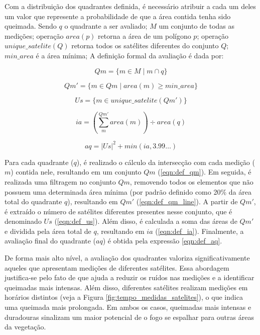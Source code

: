 \documentclass[cic,tc]{iiufrgs}
\begin{document}
Com a distribuição dos quadrantes definida, é necessário atribuir a cada um deles um valor que represente a probabilidade de que a área contida tenha sido queimada. Sendo $q$ o quadrante a ser avaliado; $M$ um conjunto de todas as medições; operação $area(p)$ retorna a área de um polígono $p$; operação $unique\_satelite(Q)$ retorna todos os satélites diferentes do conjunto $Q$; $min\_area$ é a área mínima; A definição formal da avaliação é dada por: \par

\begin{equation} \label{eqn:def_qm}
Qm = \{ m \in M \mid m \cap q \}
\end{equation}

\begin{equation} \label{eqn:def_qm_line}
Qm' = \{ m \in Qm \mid area\left(m\right) \ge min\_area \}
\end{equation}

\begin{equation} \label{eqn:def_us}
Us = \{ m \in unique\_satelite\left(Qm'\right) \}
\end{equation}

\begin{equation} \label{eqn:def_ia}
ia = \left(\sum_{m}^{Qm'} area\left(m\right)\right) \div area(q)
\end{equation}

\begin{equation} \label{eqn:def_aq}
aq = |Us|^2 + min\left(ia, 3.99\ldots \right)
\end{equation}

Para cada quadrante ($q$), é realizado o cálculo da intersecção com cada medição ($m$) contida nele, resultando em um conjunto $Qm$ (\ref{eqn:def_qm}). Em seguida, é realizada uma filtragem no conjunto $Qm$, removendo todos os elementos que não possuem uma determinada área mínima (por padrão definido como 20\% da área total do quadrante $q$), resultando em $Qm'$ (\ref{eqn:def_qm_line}). A partir de $Qm'$, é extraído o número de satélites diferentes presentes nesse conjunto, que é denominado $Us$ (\ref{eqn:def_us}). Além disso, é calculada a soma das áreas de $Qm'$ e dividida pela área total de $q$, resultando em $ia$ (\ref{eqn:def_ia}). Finalmente, a avaliação final do quadrante ($aq$) é obtida pela expressão \ref{eqn:def_aq}. \par

De forma mais alto nível, a avaliação dos quadrantes valoriza significativamente aqueles que apresentam medições de diferentes satélites. Essa abordagem justifica-se pelo fato de que ajuda a reduzir os ruídos nas medições e a identificar queimadas mais intensas. Além disso, diferentes satélites realizam medições em horários distintos (veja a Figura \ref{fig:tempo_medidas_satelites}), o que indica uma queimada mais prolongada. Em ambos os casos, queimadas mais intensas e duradouras sinalizam um maior potencial de o fogo se espalhar para outras áreas da vegetação. \par
\end{document}

